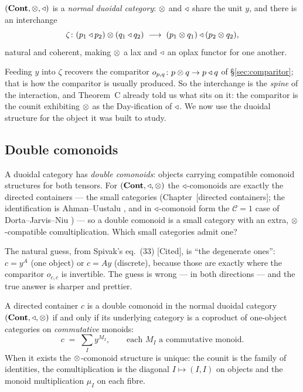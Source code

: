 \begin{Theorem}\label{thm:duoidal}
$(\mathbf{Cont},\mathbin{\otimes},\mathbin{\triangleleft})$ is a \emph{normal duoidal category}: $\mathbin{\otimes}$ and $\mathbin{\triangleleft}$ share
the unit $y$, and there is an interchange
\[
   \zeta\colon (p_1\mathbin{\triangleleft} p_2)\mathbin{\otimes}(q_1\mathbin{\triangleleft} q_2)\;\longrightarrow\;
     (p_1\mathbin{\otimes} q_1)\mathbin{\triangleleft}(p_2\mathbin{\otimes} q_2),
\]
natural and coherent, making $\mathbin{\otimes}$ a lax and $\mathbin{\triangleleft}$ an oplax functor for one
another.
\end{Theorem}

Feeding $y$ into $\zeta$ recovers the comparitor $o_{p,q}\colon p\mathbin{\otimes} q\to p\mathbin{\triangleleft}
q$ of §\ref{sec:comparitor}; that is how the comparitor is usually produced. So
the interchange is the \emph{spine} of the interaction, and Theorem~C already
told us what sits on it: the comparitor is the counit exhibiting $\mathbin{\otimes}$ as the
Day-ification of $\mathbin{\triangleleft}$. We now use the duoidal structure for the object it was
built to study.

\subsection{Double comonoids}

A duoidal category has \emph{double comonoids}: objects carrying compatible
comonoid structures for both tensors. For $(\mathbf{Cont},\mathbin{\triangleleft},\mathbin{\otimes})$ the
$\mathbin{\triangleleft}$-comonoids are exactly the directed containers --- the small categories
(Chapter~[directed containers]; the identification is Ahman--Uustalu
\cite{AhmanUustalu}, and in $\mathbin{\triangleleft}$-comonoid form the $\mathcal C=1$ case of
Dorta--Jarvis--Niu \cite[Thm.~4.3]{DJN23}) --- so a double comonoid is a small
category with an extra, $\mathbin{\otimes}$-compatible comultiplication. Which small
categories admit one?

The natural guess, from Spivak's eq.~(33) [Cited], is ``the degenerate ones'':
$c=y^A$ (one object) or $c=Ay$ (discrete), because those are exactly where the
comparitor $o_{c,c}$ is invertible. The guess is wrong --- in both directions ---
and the true answer is sharper and prettier.

\begin{Theorem}
\label{thm:doublecomonoid}
A directed container $c$ is a double comonoid in the normal duoidal category
$(\mathbf{Cont},\mathbin{\triangleleft},\mathbin{\otimes})$ if and only if its underlying category is a coproduct of
one-object categories on \emph{commutative} monoids:
\[
   c\;=\;\sum_{I} y^{M_I},\qquad\text{each }M_I\text{ a commutative monoid.}
\]
When it exists the $\mathbin{\otimes}$-comonoid structure is unique: the counit is the family
of identities, the comultiplication is the diagonal $I\mapsto(I,I)$ on objects
and the monoid multiplication $\mu_I$ on each fibre.
\end{Theorem}

